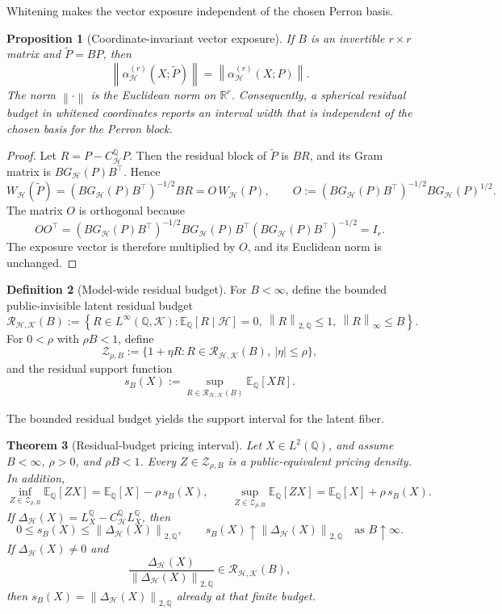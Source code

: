 \documentclass[11pt,a4paper]{amsart}
\theoremstyle{plain}
\newtheorem{theorem}{Theorem}[section]
\newtheorem{proposition}[theorem]{Proposition}
\theoremstyle{definition}
\newtheorem{definition}[theorem]{Definition}
\theoremstyle{remark}
\newcommand{\R}{\mathbb{R}}
\newcommand{\QQ}{\mathbb{Q}}
\newcommand{\EE}{\mathbb{E}}
\newcommand{\cH}{\mathcal{H}}
\newcommand{\cK}{\mathcal{K}}
\newcommand{\cR}{\mathcal{R}}
\newcommand{\cZ}{\mathcal{Z}}
\newcommand{\norm}[1]{\left\lVert #1\right\rVert}
\begin{document}
Whitening makes the vector exposure independent of the chosen Perron basis.

\begin{proposition}[Coordinate-invariant vector exposure]\label{prop:coordinate-invariant-exposure}
If \(B\) is an invertible \(r\times r\) matrix and \(\widetilde P=BP\), then
\[
        \norm{\alpha_{\cH}^{(r)}(X;\widetilde P)}
        =
        \norm{\alpha_{\cH}^{(r)}(X;P)}.
\]
The norm \(\norm{\cdot}\) is the Euclidean norm on \(\R^r\).  Consequently, a spherical residual budget
in whitened coordinates reports an interval width that is independent of the chosen basis for the
Perron block.
\end{proposition}

\begin{proof}
Let \(R=P-C_{\cH}^{\QQ}P\).  Then the residual block of \(\widetilde P\) is \(BR\), and its Gram
matrix is \(BG_{\cH}(P)B^\top\).  Hence
\[
        W_{\cH}(\widetilde P)
        =
        (BG_{\cH}(P)B^\top)^{-1/2}BR
        =
        O\,W_{\cH}(P),
        \qquad
        O:=(BG_{\cH}(P)B^\top)^{-1/2}BG_{\cH}(P)^{1/2}.
\]
The matrix \(O\) is orthogonal because
\[
        OO^\top
        =
        (BG_{\cH}(P)B^\top)^{-1/2}BG_{\cH}(P)B^\top(BG_{\cH}(P)B^\top)^{-1/2}
        =I_r.
\]
The exposure vector is therefore multiplied by \(O\), and its Euclidean norm is unchanged.
\end{proof}

\begin{definition}[Model-wide residual budget]\label{def:model-wide-residual-budget}
For \(B<\infty\), define the bounded public-invisible latent residual budget
\[
        \cR_{\cH,\cK}(B)
        :=
        \left\{
        R\in L^\infty(\QQ,\cK):
        \EE_\QQ[R\mid\cH]=0,\ 
        \norm{R}_{2,\QQ}\le1,\ 
        \norm{R}_{\infty}\le B
        \right\}.
\]
For \(0<\rho\) with \(\rho B<1\), define
\[
        \cZ_{\rho,B}
        :=
        \{1+\eta R:R\in\cR_{\cH,\cK}(B),\ |\eta|\le\rho\},
\]
and the residual support function
\[
        s_B(X)
        :=
        \sup_{R\in\cR_{\cH,\cK}(B)}\EE_\QQ[XR].
\]
\end{definition}

The bounded residual budget yields the support interval for the latent fiber.

\begin{theorem}[Residual-budget pricing interval]\label{thm:residual-budget-interval}
Let \(X\in L^2(\QQ)\), and assume \(B<\infty\), \(\rho>0\), and \(\rho B<1\).  Every
\(Z\in\cZ_{\rho,B}\) is a public-equivalent pricing density.  In addition,
\[
        \inf_{Z\in\cZ_{\rho,B}}\EE_\QQ[ZX]
        =
        \EE_\QQ[X]-\rho\,s_B(X),
        \qquad
        \sup_{Z\in\cZ_{\rho,B}}\EE_\QQ[ZX]
        =
        \EE_\QQ[X]+\rho\,s_B(X).
\]
If \(\Delta_{\cH}(X)=L_X^\QQ-C_{\cH}^{\QQ}L_X^\QQ\), then
\[
        0\le s_B(X)\le \norm{\Delta_{\cH}(X)}_{2,\QQ},
        \qquad
        s_B(X)\uparrow \norm{\Delta_{\cH}(X)}_{2,\QQ}
        \quad\text{as }B\uparrow\infty.
\]
If \(\Delta_{\cH}(X)\ne0\) and
\[
        \frac{\Delta_{\cH}(X)}{\norm{\Delta_{\cH}(X)}_{2,\QQ}}
        \in\cR_{\cH,\cK}(B),
\]
then \(s_B(X)=\norm{\Delta_{\cH}(X)}_{2,\QQ}\) already at that finite budget.
\end{theorem}
\end{document}
